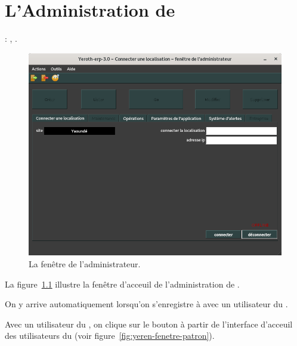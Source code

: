 \chapter{L'Administration de \yeroth}\label{chap:administration-logiciel}

\utilisateurs: \lienadmin, \lienmanager.\\



\begin{figure}[!htpb]
\centering
\includegraphics[scale=0.45]{images/yeroth-fenetre-administrateur.png}
\caption{La fen\^etre de l'administrateur.}
\label{fig:fenetre-administrateur}
\end{figure}

La figure~\ref{fig:fenetre-administrateur} illustre la
fen\^etre d'acceuil de l'administration de \yeroth.

On y arrive automatiquement lorsqu'on s'enregistre
\`a \yeroth avec un utilisateur du \role \admin.

Avec un utilisateur du \role \manager, on clique sur le
bouton  \`a partir de l'interface
d'acceuil des utilisateurs du \role \manager 
(voir figure~\ref{fig:yeren-fenetre-patron}).

\newpage


